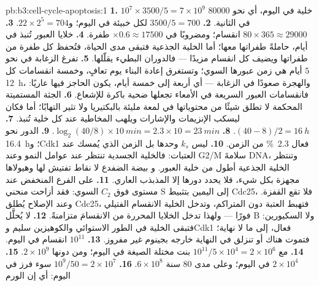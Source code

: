 \begin{solution}{pb:b3:cell-cycle-apoptosis:1}
\textbf{1.} $10^{7}\times 3500/5 = 7\times 10^{9}$ خلية في اليوم، أي نحو
\num{80000} في الثانية.
\textbf{2.} $3500/5 = 700$ لكل خبيئة في اليوم؛ و$22\times 2^{5} = 704$.
\textbf{3.} $80\times 365 \approx \num{29000}$ انقسام؛ ومضروبًا في $\times 0.6
\approx \num{17500}$ طفرة.
\textbf{4.} خلايا العبور تُنبذ في أيام، حاملةً طفراتها
معها؛ أما الخلية الجذعية فتبقى مدى الحياة، فتُحفظ كل
طفرة من طفراتها ويضيف كل انقسام مزيدًا --- فالدوران البطيء
يقلّلها.
\textbf{5.} تفرغ الزغابة في نحو $5$ أيام هي زمن عبورها
السوي؛ وتستغرق إعادة البناء يوم تعافٍ، وخمسة انقسامات كل
\qty{12}{h}، والهجرة صعودًا في الزغابة --- أي أربعة إلى خمسة أيام، يكون
الحاجز فيها عاريًا: فانقسامات العبور السريعة في الأمعاء تجعلها
ضحية باكرة للإشعاع.
\textbf{6.} الجثة المستميتة المحكمة لا تطلق شيئًا من محتوياتها في لمعة
مليئة بالبكتيريا ولا تثير التهابًا؛ أما  فكان ليسكب
الإنزيمات والإشارات ويلهب المخاطية عند كل خلية تُنبذ.
\textbf{7.} $(40 - 8)/2 = \qty{16}{h}$.
\textbf{8.} $\log_{2}(40/8)\times \qty{10}{min} = 2.3\times 10 =
\qty{23}{min}$.
\textbf{9.} الدور نحو \qty{16.4}{h}؛ وCdk1 فعال \qty{2.3}{\%} من
الزمن.
\textbf{10.} ليس $k_{s}$ وحدها بل الزمن الذي يُمسك عند العتبات:
فالخلية الجسدية تنتظر عند  عوامل النمو وعند
G2/M سلامةَ DNA، وتنتظر الخلية الجذعية أطول من خلية العبور. و
بيضة الضفدع لا نقاط تفتيش لها وهيولاها مجهزة بكل شيء، فلا
يحدد دورها إلا المذبذب العاري.
\textbf{11.} على الفرع المنخفض عند مستوى  فوق
$C_{2}$ السوي: فقد أزاحت  منحني S إلى اليمين
بتثبيط Cdc25، فلا تقع القفزة. وعند الإصلاح يُطلق Cdc25،
فتهبط العتبة دون  المتراكم، وتدخل
الخلية الانقسام الفتيلي فورًا --- ولهذا تدخل الخلايا المحررة من 
الانقسامَ متزامنةً.
\textbf{12.} لا يُحلَّل  B ولا السكيورين: فتبقى الخلية في
الطور الاستوائي والكوهيزين سليم وCdk1 فعال، إلى ما لا نهاية؛ فتموت
هناك أو تنزلق في النهاية خارجه بجينوم غير مفروز.
\textbf{13.} $10^{11}$ انقسام في اليوم.
\textbf{14.} مع  $10^{11}/5\times 10^{4} = 2\times 10^{6}$
بنت مختلة الصيغة في اليوم؛ ومن دونها $2\times 10^{9}$.
\textbf{15.} $2\times 10^{4}$ في اليوم؛ وعلى مدى $80$ سنة $6\times 10^{8}$.
\textbf{16.} $10^{9}/50 = 2\times 10^{7}$ سوء فرز في اليوم: أي إن الورم

\end{solution}
